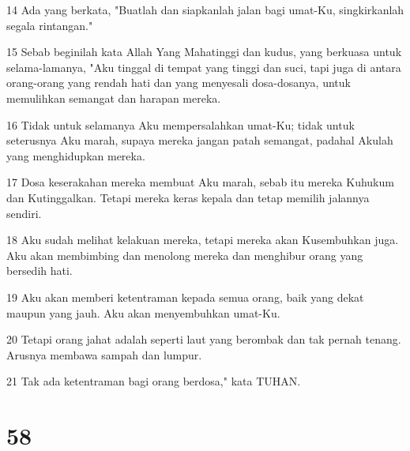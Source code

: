 \par 14 Ada yang berkata, "Buatlah dan siapkanlah jalan bagi umat-Ku, singkirkanlah segala rintangan."
\par 15 Sebab beginilah kata Allah Yang Mahatinggi dan kudus, yang berkuasa untuk selama-lamanya, "Aku tinggal di tempat yang tinggi dan suci, tapi juga di antara orang-orang yang rendah hati dan yang menyesali dosa-dosanya, untuk memulihkan semangat dan harapan mereka.
\par 16 Tidak untuk selamanya Aku mempersalahkan umat-Ku; tidak untuk seterusnya Aku marah, supaya mereka jangan patah semangat, padahal Akulah yang menghidupkan mereka.
\par 17 Dosa keserakahan mereka membuat Aku marah, sebab itu mereka Kuhukum dan Kutinggalkan. Tetapi mereka keras kepala dan tetap memilih jalannya sendiri.
\par 18 Aku sudah melihat kelakuan mereka, tetapi mereka akan Kusembuhkan juga. Aku akan membimbing dan menolong mereka dan menghibur orang yang bersedih hati.
\par 19 Aku akan memberi ketentraman kepada semua orang, baik yang dekat maupun yang jauh. Aku akan menyembuhkan umat-Ku.
\par 20 Tetapi orang jahat adalah seperti laut yang berombak dan tak pernah tenang. Arusnya membawa sampah dan lumpur.
\par 21 Tak ada ketentraman bagi orang berdosa," kata TUHAN.

\chapter{58}

